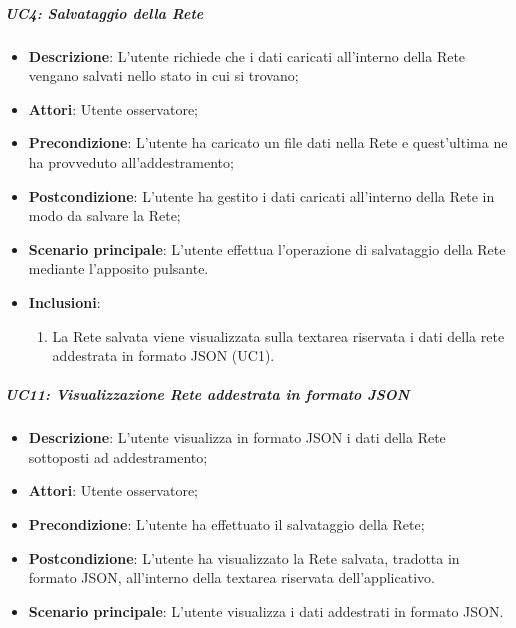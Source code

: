 \subparagraph{UC4: Salvataggio della Rete}\mbox{} 
\label{UC4: Salvataggio della Rete}
\noindent
\begin{itemize}
\item \textbf{Descrizione}: L'utente richiede che i dati caricati all'interno della Rete vengano salvati nello stato in cui si trovano;
\item \textbf{Attori}: Utente osservatore;
\item \textbf{Precondizione}: L'utente ha caricato un file dati nella Rete e quest'ultima ne ha provveduto all'addestramento;
\item \textbf{Postcondizione}: L'utente ha gestito i dati caricati all'interno della Rete in modo da salvare la Rete;
\item \textbf{Scenario principale}: L'utente effettua l'operazione di salvataggio della Rete mediante l'apposito pulsante.
\item \textbf{Inclusioni}:
\begin{enumerate}
\item La Rete salvata viene visualizzata sulla textarea riservata i dati della rete addestrata in formato JSON (UC1).
\end{enumerate}
\end{itemize}

\subparagraph{UC11: Visualizzazione Rete addestrata in formato JSON}\mbox{}
\label{UC11: Visualizzazione Rete addestrata in formato JSON}
\noindent
\begin{itemize}
\item \textbf{Descrizione}: L'utente visualizza in formato JSON i dati della Rete sottoposti ad addestramento;
\item \textbf{Attori}: Utente osservatore;
\item \textbf{Precondizione}: L'utente ha effettuato il salvataggio della Rete;
\item \textbf{Postcondizione}: L'utente ha visualizzato la Rete salvata, tradotta in formato JSON, all'interno della textarea riservata dell'applicativo.
\item \textbf{Scenario principale}: L'utente visualizza i dati addestrati in formato JSON.
\end{itemize}


